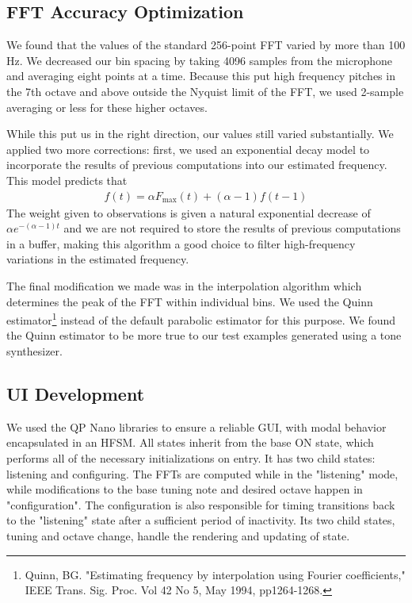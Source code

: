 \documentclass{article}
\begin{document}
\subsection{FFT Accuracy Optimization}
We found that the values of the standard 256-point FFT varied by more than 100 Hz.
We decreased our bin spacing by taking 4096 samples from the microphone and averaging eight points at a time.
Because this put high frequency pitches in the 7th octave and above outside the Nyquist limit of the FFT, we used 2-sample averaging or less for these higher octaves.
\par
While this put us in the right direction, our values still varied substantially.
We applied two more corrections: first, we used an exponential decay model to incorporate the results of previous computations into our estimated frequency.
This model predicts that 
\begin{align}
	f(t) = \alpha F_\text{max}(t) + (\alpha - 1) f(t - 1)
\end{align}
The weight given to observations is given a natural exponential decrease of $\alpha e^{-(\alpha - 1) t}$ and we are not required to store the results of previous computations in a buffer, making this algorithm a good choice to filter high-frequency variations in the estimated frequency. \par
The final modification we made was in the interpolation algorithm which determines the peak of the FFT within individual bins.
We used the Quinn estimator\footnote{Quinn, BG. "Estimating frequency by interpolation using Fourier coefficients," IEEE Trans. Sig. Proc. Vol 42 No 5, May 1994, pp1264-1268.} instead of the default parabolic estimator for this purpose. 
We found the Quinn estimator to be more true to our test examples generated using a tone synthesizer.
\subsection{UI Development}
We used the QP Nano libraries to ensure a reliable GUI, with modal behavior encapsulated in an HFSM. All states inherit from the base ON state, which performs all of the necessary initializations on entry. It has two child states: listening and configuring. The FFTs are computed while in the "listening" mode, while modifications to the base tuning note and desired octave happen in "configuration". The configuration is also responsible for timing transitions back to the "listening" state after a sufficient period of inactivity. Its two child states, tuning and octave change, handle the rendering and updating of state.  
\end{document}
